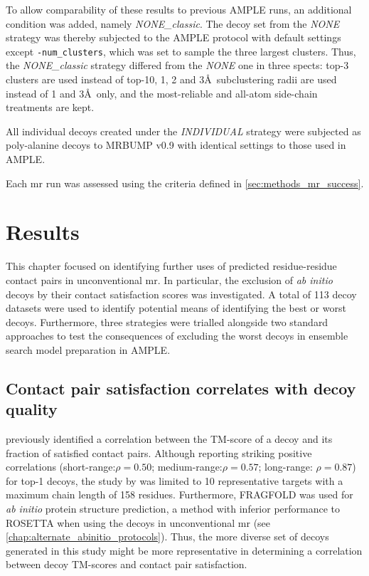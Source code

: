 To allow comparability of these results to previous AMPLE runs, an additional condition was added, namely \textit{NONE\_classic}. The decoy set from the \textit{NONE} strategy was thereby subjected to the AMPLE protocol with default settings except \texttt{-num\_clusters}, which was set to sample the three largest clusters. Thus, the \textit{NONE\_classic} strategy differed from the \textit{NONE} one in three spects: top-3 clusters are used instead of top-10, 1, 2 and 3\AA\ subclustering radii are used instead of 1 and 3\AA\ only, and the most-reliable and all-atom side-chain treatments are kept.

All individual decoys created under the \textit{INDIVIDUAL} strategy were subjected as poly-alanine decoys to MRBUMP v0.9 \cite{Keegan2018-kn} with identical settings to those used in AMPLE. 

Each \gls{mr} run was assessed using the criteria defined in \cref{sec:methods_mr_success}.

\section{Results}
This chapter focused on identifying further uses of predicted residue-residue contact pairs in unconventional \gls{mr}. In particular, the exclusion of \textit{ab initio} decoys by their contact satisfaction scores was investigated. A total of 113 decoy datasets were used to identify potential means of identifying the best or worst decoys. Furthermore, three strategies were trialled alongside two standard approaches to test the consequences of excluding the worst decoys in ensemble search model preparation in AMPLE.

\subsection{Contact pair satisfaction correlates with decoy quality} \label{subsec:ample_saint2_concorr}
\textcite{Kosciolek2014-bt} previously identified a correlation between the TM-score of a decoy and its fraction of satisfied contact pairs. Although reporting striking positive correlations (short-range:$\rho=0.50$; medium-range:$\rho=0.57$; long-range: $\rho=0.87$) for top-1 decoys, the study by \textcite{Kosciolek2014-bt} was limited to 10 representative targets with a maximum chain length of 158 residues. Furthermore, FRAGFOLD \cite{Jones2001-mc} was used for \textit{ab initio} protein structure prediction, a method with inferior performance to ROSETTA \cite{Rohl2004-dj} when using the decoys in unconventional \gls{mr} (see \cref{chap:alternate_abinitio_protocols}). Thus, the more diverse set of decoys generated in this study might be more representative in determining a correlation between decoy TM-scores and contact pair satisfaction.

